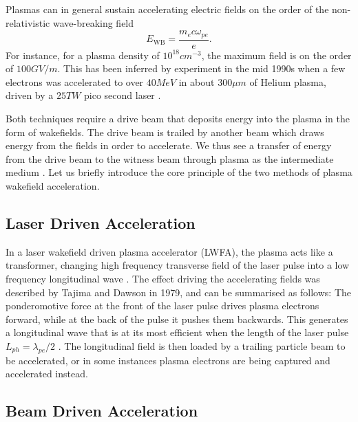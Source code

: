Plasmas can in general sustain accelerating electric fields on the order of the non-relativistic wave-breaking field \cite{dawson:1959, esarey:1996}
\begin{equation}
    E_{\mathrm{WB}} = \frac{m_{e} c \omega_{pe}}{e}. \label{EQ:EWB}
\end{equation}
For instance, for a plasma density of $10^{18}\unit{cm}^{-3}$, the maximum field is on the order of $100\unit{GV/m}$. This has been inferred by experiment in the mid 1990s when a few electrons was accelerated to over $40\unit{MeV}$ in about $300\unit{\mu m}$ of Helium plasma, driven by a $25\unit{TW}$ pico second laser \cite{modena:1995}.

Both techniques require a drive beam that deposits energy into the plasma in the form of wakefields. The drive beam is trailed by another beam which draws energy from the fields in order to accelerate. We thus see a transfer of energy from the drive beam to the witness beam through plasma as the intermediate medium \cite{muggli:2009}. Let us briefly introduce the core principle of the two methods of plasma wakefield acceleration. 

\subsection{Laser Driven Acceleration}
\label{Int:LWFA}

In a laser wakefield driven plasma accelerator (LWFA), the plasma acts like a transformer, changing high frequency transverse field of the laser pulse into a low frequency longitudinal wave \cite{malka:2009}. The effect driving the accelerating fields was described by Tajima and Dawson in 1979, and can be summarised as follows: The ponderomotive force at the front of the laser pulse drives plasma electrons forward, while at the back of the pulse it pushes them backwards. This generates a longitudinal wave that is at its most efficient when the length of the laser pulse $L_{ph} = \lambda_{pe}/2$ \cite{tajima:1979}. The longitudinal field is then loaded by a trailing particle beam to be accelerated, or in some instances plasma electrons are being captured and accelerated instead.

\subsection{Beam Driven Acceleration}
\label{Int:BDPWFA}

